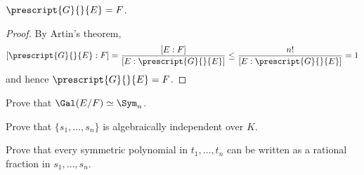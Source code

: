 \begin{theorem}
    $\prescript{G}{}{E}=F$.
\end{theorem}

\begin{proof}
    By Artin's theorem,
    \[
    \left[\prescript{G}{}{E}:F\right]=\frac{[E:F]}{\left[E:\prescript{G}{}{E}\right]}
    \leq\frac{n!}{\left[E:\prescript{G}{}{E}\right]}=1
    \]
    and hence $\prescript{G}{}{E}=F$.
\end{proof}

\begin{exercise}
    Prove that $\Gal(E/F)\simeq\Sym_n$.
\end{exercise}

\begin{exercise}
    Prove that $\{s_1,\dots,s_n\}$ is algebraically independent over $K$. 
\end{exercise}

\begin{exercise}
    Prove that every symmetric polynomial in $t_1,\dots,t_n$ can be written as a rational
    fraction in $s_1,\dots,s_n$. 
\end{exercise}

